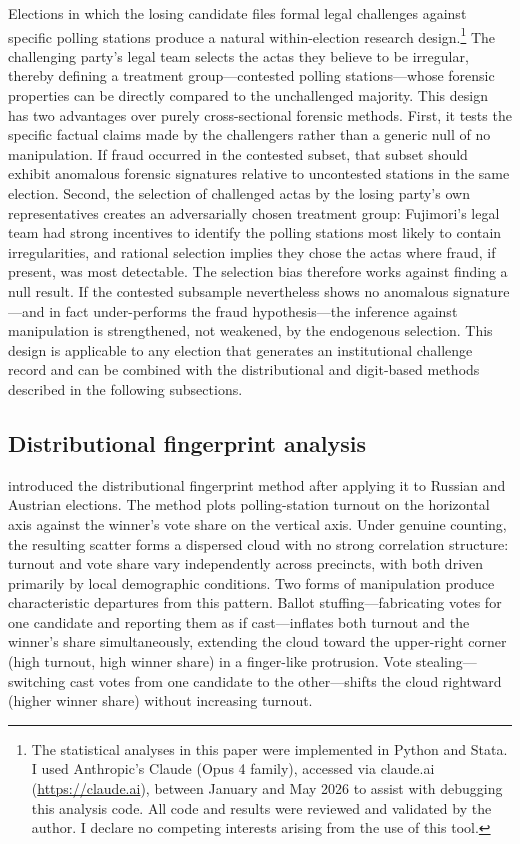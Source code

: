 \documentclass[12pt]{article}
\begin{document}
Elections in which the losing candidate files formal legal challenges against
specific polling stations produce a natural within-election research design.\footnote{%
  The statistical analyses in this paper were implemented in Python and Stata.
  I used Anthropic's Claude (Opus 4 family), accessed via claude.ai
  (\url{https://claude.ai}), between January and May 2026 to assist with
  debugging this analysis code. All code and results were reviewed and
  validated by the author. I declare no competing interests arising from the
  use of this tool.}
The challenging party's legal team selects the actas they believe to be
irregular, thereby defining a treatment group---contested polling
stations---whose forensic properties can be directly compared to the
unchallenged majority. This design has two advantages over purely
cross-sectional forensic methods. First, it tests the specific factual claims
made by the challengers rather than a generic null of no manipulation. If
fraud occurred in the contested subset, that subset should exhibit anomalous
forensic signatures relative to uncontested stations in the same election.
Second, the selection of challenged actas by the losing party's own
representatives creates an adversarially chosen treatment group: Fujimori's
legal team had strong incentives to identify the polling stations most likely
to contain irregularities, and rational selection implies they chose the
actas where fraud, if present, was most detectable. The selection bias
therefore works against finding a null result. If the contested subsample
nevertheless shows no anomalous signature---and in fact under-performs the
fraud hypothesis---the inference against manipulation is strengthened, not
weakened, by the endogenous selection. This design is applicable to any
election that generates an institutional challenge record and can be combined
with the distributional and digit-based methods described in the following
subsections.

\subsection{Distributional fingerprint analysis}

\citet{klimek2012} introduced the distributional fingerprint method after
applying it to Russian and Austrian elections. The method plots polling-station
turnout on the horizontal axis against the winner's vote share on the vertical
axis. Under genuine counting, the resulting scatter forms a dispersed cloud
with no strong correlation structure: turnout and vote share vary
independently across precincts, with both driven primarily by local demographic
conditions. Two forms of manipulation produce characteristic departures from
this pattern. Ballot stuffing---fabricating votes for one candidate and
reporting them as if cast---inflates both turnout and the winner's share
simultaneously, extending the cloud toward the upper-right corner
(high turnout, high winner share) in a finger-like protrusion. Vote
stealing---switching cast votes from one candidate to the other---shifts the
cloud rightward (higher winner share) without increasing turnout.
\end{document}
